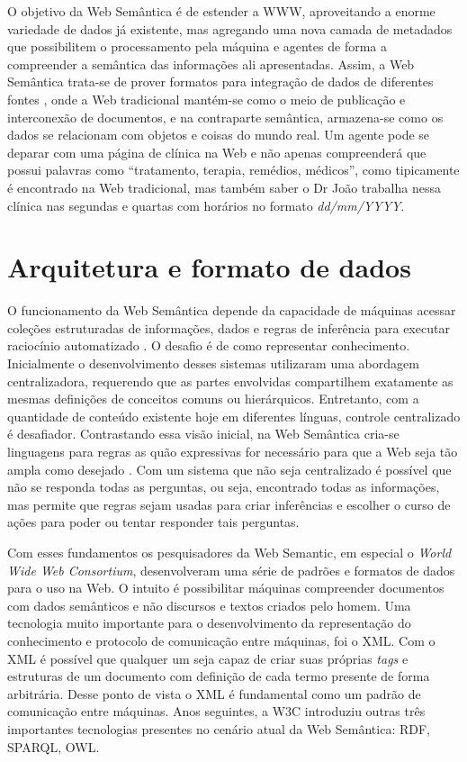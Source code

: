 O objetivo da Web Semântica é de estender a WWW, aproveitando a enorme variedade de dados já existente, mas agregando uma nova camada de metadados que possibilitem o processamento pela máquina e agentes de forma a compreender a semântica das informações ali apresentadas. Assim, a Web Semântica trata-se de prover formatos para integração de dados de diferentes fontes \citep{SemanticWebW3C}, onde a Web tradicional mantém-se como o meio de publicação e interconexão de documentos, e na contraparte semântica, armazena-se como os dados se relacionam com objetos e coisas do mundo real. Um agente pode se deparar com uma página de clínica na Web e não apenas compreenderá que possui palavras como “tratamento, terapia, remédios, médicos”, como tipicamente é encontrado na Web tradicional, mas também saber o Dr João trabalha nessa clínica nas segundas e quartas com horários no formato \textit{dd/mm/YYYY}.

\section{Arquitetura e formato de dados}

O funcionamento da Web Semântica depende da capacidade de máquinas acessar coleções estruturadas de informações, dados e regras de inferência para executar raciocínio automatizado \citep{bernerslee2001semantic}. O desafio é de como representar conhecimento. Inicialmente o desenvolvimento desses sistemas utilizaram uma abordagem centralizadora, requerendo que as partes envolvidas compartilhem exatamente as mesmas definições de conceitos comuns ou hierárquicos. Entretanto, com a quantidade de conteúdo existente hoje em diferentes línguas, controle centralizado é desafiador. Contrastando essa visão inicial, na Web Semântica cria-se linguagens para regras as quão expressivas for necessário para que a Web seja tão ampla como desejado \citep{bernerslee2001semantic}. Com um sistema que não seja centralizado é possível que não se responda todas as perguntas, ou seja, encontrado todas as informações, mas permite que regras sejam usadas para criar inferências e escolher o curso de ações para poder ou tentar responder tais perguntas.

Com esses fundamentos os pesquisadores da Web Semantic, em especial o \textit{World Wide Web Consortium}, desenvolveram uma série de padrões e formatos de dados para o uso na Web. O intuito é possibilitar máquinas compreender documentos com dados semânticos e não discursos e textos criados pelo homem. Uma tecnologia muito importante para o desenvolvimento da representação do conhecimento e protocolo de comunicação entre máquinas, foi o XML. Com o XML é possível que qualquer um seja capaz de criar suas próprias \textit{tags} e estruturas de um documento com definição de cada termo presente de forma arbitrária. Desse ponto de vista o XML é fundamental como um padrão de comunicação entre máquinas. Anos seguintes, a W3C introduziu outras três importantes tecnologias presentes no cenário atual da Web Semântica: RDF, SPARQL, OWL.

